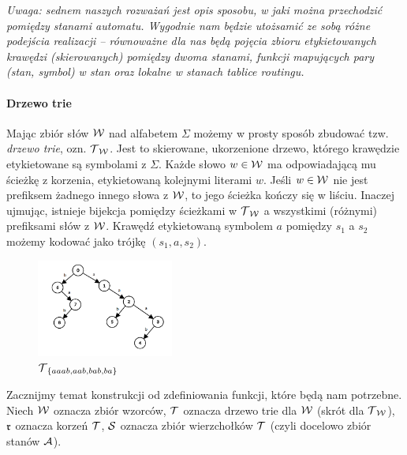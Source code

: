 \textit{Uwaga: sednem naszych rozważań jest opis sposobu, w jaki można przechodzić pomiędzy stanami automatu. Wygodnie nam będzie utożsamić ze sobą różne podejścia realizacji -- równoważne dla nas będą pojęcia zbioru etykietowanych krawędzi (skierowanych) pomiędzy dwoma stanami, funkcji mapujących pary (stan, symbol) w stan oraz lokalne w stanach tablice routingu.}

\paragraph{Drzewo trie}
Mając zbiór słów $\operatorname{\mathcal{W}}$ nad alfabetem $\Sigma$ możemy w prosty sposób zbudować tzw. \textit{drzewo trie}, ozn. $\operatorname{\mathcal{T}}_{\operatorname{\mathcal{W}}}$. Jest to skierowane, ukorzenione drzewo, którego krawędzie etykietowane są symbolami z $\Sigma$. Każde słowo $w\in\operatorname{\mathcal{W}}$ ma odpowiadającą mu ścieżkę z korzenia, etykietowaną kolejnymi literami $w$. Jeśli $w\in\operatorname{\mathcal{W}}$ nie jest prefiksem żadnego innego słowa z $\operatorname{\mathcal{W}}$, to jego ścieżka kończy się w liściu. Inaczej ujmując, istnieje bijekcja pomiędzy ścieżkami w $\operatorname{\mathcal{T}}_{\operatorname{\mathcal{W}}}$ a wszystkimi (różnymi) prefiksami słów z $\operatorname{\mathcal{W}}$. Krawędź etykietowaną symbolem $a$ pomiędzy $s_1$ a $s_2$ możemy kodować jako trójkę $(s_1, a, s_2)$.

\begin{figure}[h!]
    \centering
    \includegraphics[width=0.4\textwidth]{graphics/trie-example.png}
    \caption{$\operatorname{\mathcal{T}}_{\{aaab, aab, bab, ba\}}$}
    \label{fig:trie}
\end{figure}

Zacznijmy temat konstrukcji od zdefiniowania funkcji, które będą nam potrzebne. Niech $\operatorname{\mathcal{W}}$ oznacza zbiór wzorców, $\operatorname{\mathcal{T}}$ oznacza drzewo trie dla $\operatorname{\mathcal{W}}$ (skrót dla $\operatorname{\mathcal{T}}_{\operatorname{\mathcal{W}}}$), $\operatorname{\mathfrak{r}}$ oznacza korzeń $\operatorname{\mathcal{T}}$, $\operatorname{\mathcal{S}}$ oznacza zbiór wierzchołków $\operatorname{\mathcal{T}}$ (czyli docelowo zbiór stanów $\operatorname{\mathcal{A}}$).

